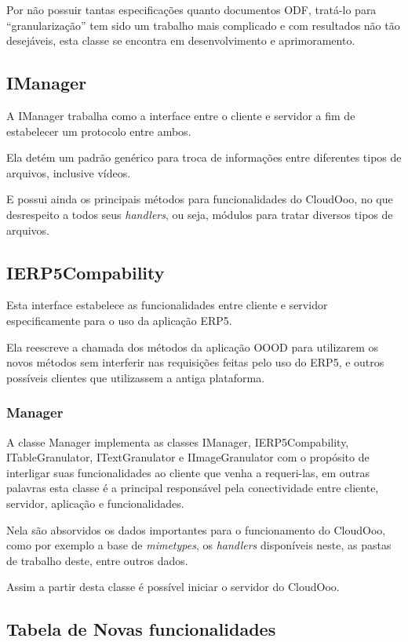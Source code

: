 Por não possuir tantas especificações quanto documentos ODF, tratá-lo para ``granularização'' tem sido um trabalho mais complicado e com resultados não tão desejáveis, esta classe se encontra em desenvolvimento e aprimoramento.


\subsection{IManager}

A IManager trabalha como a interface entre o cliente e servidor a fim de estabelecer um protocolo entre ambos.

Ela detém um padrão genérico para troca de informações entre diferentes tipos de arquivos, inclusive vídeos. 

E possui ainda os principais métodos para funcionalidades do CloudOoo, no que desrespeito a todos seus \textit{handlers}, ou seja, módulos para tratar diversos tipos de arquivos.


\subsection{IERP5Compability}

Esta interface estabelece as funcionalidades entre cliente e servidor especificamente para o uso da aplicação ERP5. 

Ela reescreve a chamada dos métodos da aplicação OOOD para utilizarem os novos métodos sem interferir nas requisições feitas pelo uso do ERP5, e outros possíveis clientes que utilizassem a antiga plataforma.


\subsubsection{Manager}

A classe Manager implementa as classes IManager, IERP5Compability, ITableGranulator, ITextGranulator e IImageGranulator com o propósito de interligar suas funcionalidades ao cliente que venha a requeri-las, em outras palavras esta classe é a principal responsável pela conectividade entre cliente, servidor, aplicação e funcionalidades.

Nela são absorvidos os dados importantes para o funcionamento do CloudOoo, como por exemplo a base de \textit{mimetypes}, os \textit{handlers} disponíveis neste, as pastas de trabalho deste, entre outros dados.

Assim a partir desta classe é possível iniciar o servidor do CloudOoo.
\subsection{Tabela de Novas funcionalidades}

